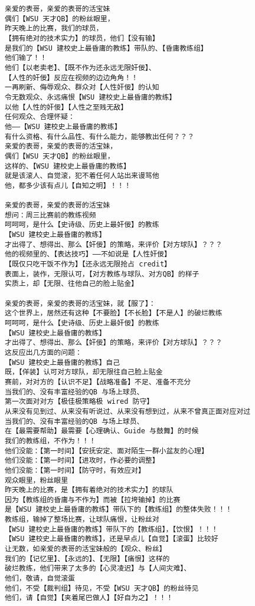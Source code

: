 \documentclass[9pt, b5paper]{article}
\begin{document}
\begin{itemize}
\begin{verbatim}
亲爱的表哥，亲爱的表哥的活宝妹
偶们【WSU 天才QB】的粉丝眼里，
昨天晚上的比赛，我们的球员，
【拥有绝对的技术实力】的球员，他们【没有输】
是我们的【WSU 建校史上最昏庸的教练】带队的、【昏庸教练组】
他们输了！！
他们【以老卖老】、【既不作为还永远无限奸佞】、
【人性的奸佞】反应在视频的边边角角！！
一再刷新、侮辱观众、群众对【人性奸佞】的认知
令无数观众、永远痛恨【WSU 建校史上最昏庸的教练】
以他【人性的奸佞】【人性之至贱无敌】
任何观众、合理怀疑：
他——【WSU 建校史上最昏庸的教练】
有什么资格、有什么品性、有什么能力，能够教出任何？？？
亲爱的表哥，亲爱的表哥的活宝妹，
偶们【WSU 天才QB】的粉丝眼里，
这样的、【WSU 建校史上最昏庸的教练】
就是该滚人、自觉滚，犯不着任何人站出来谩骂他
他，都多少该有点儿【自知之明】！！！

亲爱的表哥，亲爱的表哥的活宝妹
想问：周三比赛前的教练视频
呵呵呵，是什么【史诗级、历史上最奸佞】的教练
【WSU 建校史上最昏庸的教练】
才出得了、想得出、那么【奸佞】的策略，来评价【对方球队】？？？
他的视频里的、【表达技巧】——不如说是【人性奸佞】
【既仅只吃干饭不作为】【还永远无限抢占 credit】
表面上，装作，无限认可，【对方教练与球队、对方QB】的样子
实质上，却【无限、往他自己的脸上贴金】

亲爱的表哥，亲爱的表哥的活宝妹，就【服了】：
这个世界上，居然还有这种【不要脸】【不长脸】【不是人】的破烂教练
呵呵呵，是什么【史诗级、历史上最奸佞】的教练
【WSU 建校史上最昏庸的教练】
才出得了、想得出、那么【奸佞】的策略，来评价【对方球队】？？？
这反应出几方面的问题：
【WSU 建校史上最昏庸的教练】自己
既，【佯装】认可对方球队，却无限往自己脸上贴金
赛前，对对方的【认识不足】【战略准备】不足、准备不充分
当我们的、没有丰富经验的QB 与场上球员、
第一次面对对方【极佳极策略极 wired 防守】
从来没有见到过、从来没有听说过、从来没有想到过，从来不曾真正面对应对过
当我们的、没有丰富经验的QB 与场上球员、
在【最需要帮助】最需要【心理确认、Guide 与鼓舞】的时候
我们的教练组，不作为！！！
他们没能：【第一时间】【安抚安定、面对陌生一群小盆友的心理】
他们没能：【第一时间】【进攻时，作必要的调整】
他们没能：【第一时间】【防守时，有效应对】
观众眼里，粉丝眼里
昨天晚上的比赛，是【拥有着绝对的技术实力】的球队
因为【教练组的昏庸与不作为】而被【拉垮输掉】的比赛
是【WSU 建校史上最昏庸的教练】带队下的【教练组】的整体失败！！！
教练组，输掉了整场比赛，让球队痛恨，让粉丝对
【WSU 建校史上最昏庸的教练】带队下的【教练组】，【饮恨】！！！
【WSU 建校史上最昏庸的教练】，还是早点儿【自觉】【滚蛋】比较好
让无数，如亲爱的表哥的活宝妹般的【观众、粉丝】
我们的【记忆里】、【永远的】、【无限】【痛恨】这样的
破烂教练，他们带来了太多的【心灵凌迟】与【人间灾难】、
他们，敬请，自觉滚蛋
他们，不受【裁判组】待见，不受【WSU 天才QB】的粉丝待见
他们，请【自觉】【夹着尾巴做人】【好自为之】！！！


\end{verbatim}
\end{itemize}
\end{document}
